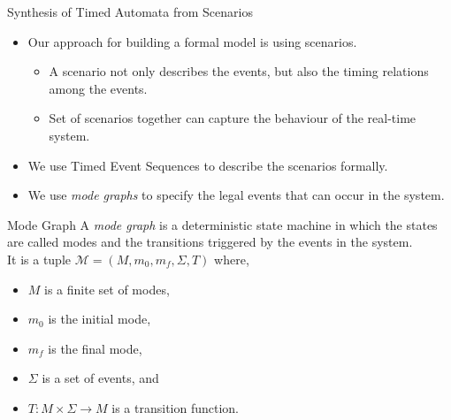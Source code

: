 \documentclass[10pt]{beamer}
\theoremstyle{plain}
\theoremstyle{definition}
\begin{document}
\begin{frame}{Synthesis of Timed Automata from Scenarios}
	\begin{itemize}
		\item {Our approach for building a formal model is using scenarios. 
			\begin{itemize}
				\item A scenario not only describes the events, but also the timing relations among the events.
				\item Set of scenarios together can capture the behaviour of the real-time system.
			\end{itemize}
			}
		\item We use Timed Event Sequences to describe the scenarios formally.
		\item We use \emph{mode graphs} to specify the legal events that can occur in the system.
	\end{itemize}	
\end{frame}


\begin{frame}{Mode Graph}
A \emph{mode graph} is a deterministic state machine in which the states are called modes and the transitions triggered by the events in the system. \\
It is a tuple $\mathcal{M} = (M, m_0, m_f, \Sigma, T)$ where,
\begin{itemize}
	\item $M$ is a finite set of modes,
	\item $m_0$ is the initial mode, 
	\item $m_f$ is the final mode, 
	\item $\Sigma$ is a set of events, and 
	\item $T: M\times \Sigma \rightarrow M$ is a
	transition function.
\end{itemize}
\end{frame}
\end{document}
